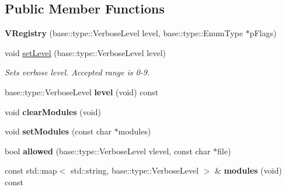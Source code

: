 \subsection*{Public Member Functions}
\begin{DoxyCompactItemize}
\item 
\mbox{\label{classel_1_1base_1_1_v_registry_ac4b36d32d3722238024480ce66c52ad0}} 
{\bfseries V\+Registry} (base\+::type\+::\+Verbose\+Level level, base\+::type\+::\+Enum\+Type $\ast$p\+Flags)
\item 
\mbox{\label{classel_1_1base_1_1_v_registry_aea4fb84a03363080ee2501193084f71f}} 
void \hyperlink{classel_1_1base_1_1_v_registry_aea4fb84a03363080ee2501193084f71f}{set\+Level} (base\+::type\+::\+Verbose\+Level level)
\begin{DoxyCompactList}\small\item\em Sets verbose level. Accepted range is 0-\/9. \end{DoxyCompactList}\item 
\mbox{\label{classel_1_1base_1_1_v_registry_aa39f3774ffc25a2ad18bb86c8c4b8b7c}} 
base\+::type\+::\+Verbose\+Level {\bfseries level} (void) const
\item 
\mbox{\label{classel_1_1base_1_1_v_registry_a52de90db82e57827ac3d3994f70c17cf}} 
void {\bfseries clear\+Modules} (void)
\item 
\mbox{\label{classel_1_1base_1_1_v_registry_a65e202cc547cd11231d3ea0fb70765d0}} 
void {\bfseries set\+Modules} (const char $\ast$modules)
\item 
\mbox{\label{classel_1_1base_1_1_v_registry_a13b725e3da8935fce5cf3c16fd3a2ff9}} 
bool {\bfseries allowed} (base\+::type\+::\+Verbose\+Level vlevel, const char $\ast$file)
\item 
\mbox{\label{classel_1_1base_1_1_v_registry_a72ed42bb862bb45880b9f7ffc4c2bc90}} 
const std\+::map$<$ std\+::string, base\+::type\+::\+Verbose\+Level $>$ \& {\bfseries modules} (void) const
\item 
\mbox{\label{classel_1_1base_1_1_v_registry_a811e62d7d016a0714b4363f47216a9da}} 

\end{DoxyCompactItemize}

